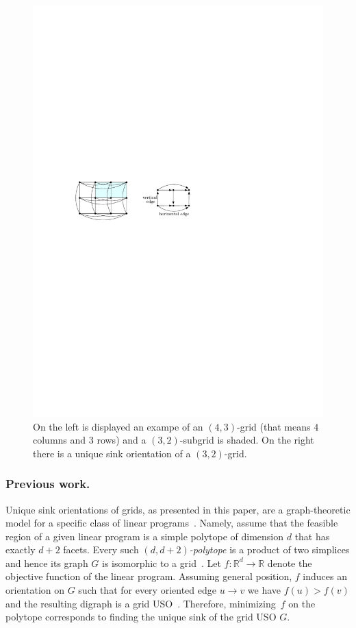 \documentclass[runningheads,a4paper]{llncs}
\newcommand{\RR}{\ensuremath{\mathbb{R}}}
\begin{document}
  \begin{figure}[htbp] 
  	\centering
  	\includegraphics{uso_example.pdf}
  	\caption{\small On the left is displayed an exampe of an $(4,3)$-grid (that means $4$ columns and $3$ rows) 
  	and a $(3,2)$-subgrid is shaded. On the right there is a unique sink orientation of a $(3,2)$-grid.} 
  	\label{fig:examplegrid}
  \end{figure}



\subsubsection{Previous work.}

Unique sink orientations of grids, as presented in this paper,
are a graph-theoretic model for a specific class of linear programs~\cite{linepoint}.
Namely, assume that the feasible region of a given linear program is a
simple polytope of dimension $d$ that has exactly $d+2$ facets.
Every such \emph{$(d, d+2)$-polytope} is a product of two simplices and hence its graph $G$ is isomorphic to a grid~\cite{grid05}. 
Let $f : \RR^d \to \RR$ denote the objective function of the linear program.
Assuming general position, $f$ induces an orientation on $G$ such that for every oriented
edge $u \to v$ we have $f(u) > f(v)$ and the resulting digraph is a grid USO~\cite{grid05}.
Therefore, minimizing~$f$ on the polytope corresponds to finding the
unique sink of the grid USO $G$.
\end{document}
